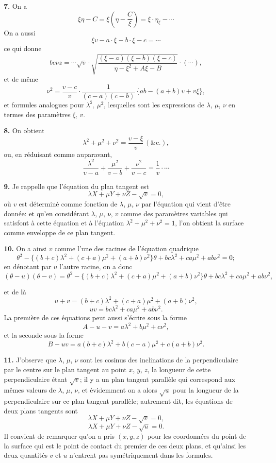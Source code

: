\documentclass[11pt,a4paper]{article}
\begin{document}
\textbf{7.} On a
\[
\xi\eta - C = \xi\!\left(\eta - \frac{C}{\xi}\right) = \xi \cdot \eta_{\xi} - \cdots
\]
On a aussi
\[
\xi v - a\cdot \xi - b\cdot \xi - c = \cdots
\]
ce qui donne
\[
bc\nu z = \cdots\sqrt{v}\cdot\sqrt{\frac{(\xi - a)(\xi - b)(\xi - c)}{\eta - \xi^2 + A\xi - B}}\cdot(\cdots),
\]
et de m\^eme
\[
\nu^2 = \frac{v - c}{v}\cdot\frac{1}{(c - a)(c - b)}\,\{ab - (a + b)v + v\xi\},
\]
et formules analogues pour $\lambda^2$, $\mu^2$,
lesquelles sont les expressions de $\lambda$, $\mu$, $\nu$ en termes des param\`etres $\xi$, $v$.

\textbf{8.} On obtient
\[
\lambda^2 + \mu^2 + \nu^2 = \frac{v - \xi}{v}\,(\text{\&c.}),
\]
ou, en r\'eduisant comme auparavant,
\[
\frac{\lambda^2}{v - a} + \frac{\mu^2}{v - b} + \frac{\nu^2}{v - c} = \frac{1}{v}\cdot\cdots
\]

\textbf{9.} Je rappelle que l'\'equation du plan tangent est
\[
\lambda X + \mu Y + \nu Z - \sqrt{v} = 0,
\]
o\`u $v$ est d\'etermin\'e comme fonction de $\lambda$, $\mu$, $\nu$ par l'\'equation qui vient d'\^etre donn\'ee: et qu'en consid\'erant $\lambda$, $\mu$, $\nu$, $v$ comme des param\`etres variables qui satisfont \`a cette \'equation et \`a l'\'equation $\lambda^2 + \mu^2 + \nu^2 = 1$, l'on obtient la surface comme enveloppe de ce plan tangent.

\textbf{10.} On a ainsi $v$ comme l'une des racines de l'\'equation quadrique
\[
\theta^2 - \{(b + c)\lambda^2 + (c + a)\mu^2 + (a + b)\nu^2\}\theta + bc\lambda^2 + ca\mu^2 + ab\nu^2 = 0;
\]
en d\'enotant par $u$ l'autre racine, on a donc
\[
(\theta - u)(\theta - v) = \theta^2 - \{(b + c)\lambda^2 + (c + a)\mu^2 + (a + b)\nu^2\}\theta + bc\lambda^2 + ca\mu^2 + ab\nu^2,
\]

et de l\`a
\[
u + v = (b + c)\lambda^2 + (c + a)\mu^2 + (a + b)\nu^2,
\]
\[
uv = bc\lambda^2 + ca\mu^2 + ab\nu^2.
\]
La premi\`ere de ces \'equations peut aussi s'\'ecrire sous la forme
\[
A - u - v = a\lambda^2 + b\mu^2 + c\nu^2,
\]
et la seconde sous la forme
\[
B - uv = a(b + c)\lambda^2 + b(c + a)\mu^2 + c(a + b)\nu^2.
\]

\textbf{11.} J'observe que $\lambda$, $\mu$, $\nu$ sont les cosinus des inclinations de la perpendiculaire par le centre sur le plan tangent au point $x$, $y$, $z$, la longueur de cette perpendiculaire \'etant $\sqrt{v}$; il y a un plan tangent parall\`ele qui correspond aux m\^emes valeurs de $\lambda$, $\mu$, $\nu$, et \'evidemment on a alors $\sqrt{u}$ pour la longueur de la perpendiculaire sur ce plan tangent parall\`ele; autrement dit, les \'equations de deux plans tangents sont
\[
\lambda X + \mu Y + \nu Z - \sqrt{v} = 0,
\]
\[
\lambda X + \mu Y + \nu Z - \sqrt{u} = 0.
\]
Il convient de remarquer qu'on a pris $(x, y, z)$ pour les coordonn\'ees du point de la surface qui est le point de contact du premier de ces deux plans, et qu'ainsi les deux quantit\'es $v$ et $u$ n'entrent pas sym\'etriquement dans les formules.
\end{document}
